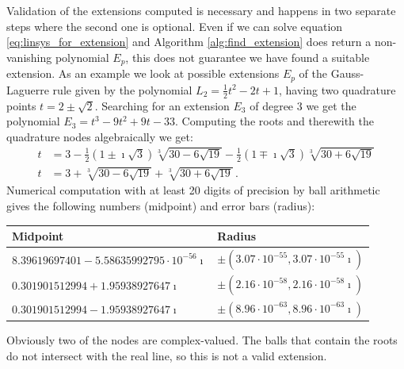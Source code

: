 \documentclass[a4paper,10pt]{article}
\begin{document}
Validation of the extensions computed is necessary and happens in
two separate steps where the second one is optional. Even if we
can solve equation \eqref{eq:linsys_for_extension} and Algorithm
\ref{alg:find_extension} does return a non-vanishing polynomial $E_p$,
this does not guarantee we have found a suitable extension.
As an example we look at possible extensions $E_p$ of the Gauss-Laguerre rule
given by the polynomial $L_2 = \frac{1}{2}t^2 - 2t + 1$, having two quadrature
points $t = 2 \pm \sqrt{2}$.
Searching for an extension $E_3$ of degree 3 we get the polynomial $E_3 = t^3 - 9t^2 + 9t - 33$.
Computing the roots and therewith the quadrature nodes algebraically we get:
\begin{align*}
  t & = 3 -\frac{1}{2} \left(1 \pm \imath \sqrt{3}\right) \sqrt[3]{30 - 6\sqrt{19}}
          -\frac{1}{2} \left(1 \mp \imath \sqrt{3}\right) \sqrt[3]{30 + 6\sqrt{19}} \\
  t & = 3 + \sqrt[3]{30 - 6\sqrt{19}} + \sqrt[3]{30 + 6\sqrt{19}} \,.
\end{align*}
Numerical computation with at least 20 digits of precision by ball arithmetic
gives the following numbers (midpoint) and error bars (radius):
\begin{center}
  \begin{tabular}{|l|l|}
  \hline
  Midpoint & Radius \\
  \hline
  $8.39619697401 - 5.58635992795 \cdot 10^{-56}\imath$ & $\pm (3.07 \cdot 10^{-55}, 3.07 \cdot 10^{-55}\imath)$ \\
  $0.301901512994 + 1.95938927647\imath$               & $\pm (2.16 \cdot 10^{-58}, 2.16 \cdot 10^{-58}\imath)$ \\
  $0.301901512994 - 1.95938927647\imath$               & $\pm (8.96 \cdot 10^{-63}, 8.96 \cdot 10^{-63}\imath)$ \\
  \hline
  \end{tabular}
\end{center}
Obviously two of the nodes are complex-valued. The balls that contain the roots
do not intersect with the real line, so this is not a valid extension.
\end{document}
